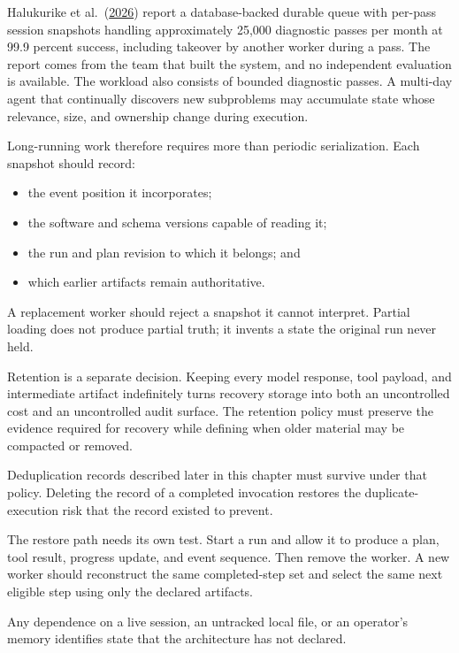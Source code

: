 Halukurike et al.~(\href{https://tech.instacart.com/blueberry-force-multiplier-for-the-on-call-engineer-98c446dfcc12}{2026}) report a database-backed durable queue with per-pass session snapshots handling approximately 25,000 diagnostic passes per month at 99.9 percent success, including takeover by another worker during a pass. The report comes from the team that built the system, and no independent evaluation is available. The workload also consists of bounded diagnostic passes. A multi-day agent that continually discovers new subproblems may accumulate state whose relevance, size, and ownership change during execution.

Long-running work therefore requires more than periodic serialization. Each snapshot should record:

\begin{itemize}
\tightlist
\item
  the event position it incorporates;
\item
  the software and schema versions capable of reading it;
\item
  the run and plan revision to which it belongs; and
\item
  which earlier artifacts remain authoritative.
\end{itemize}

A replacement worker should reject a snapshot it cannot interpret. Partial loading does not produce partial truth; it invents a state the original run never held.

Retention is a separate decision. Keeping every model response, tool payload, and intermediate artifact indefinitely turns recovery storage into both an uncontrolled cost and an uncontrolled audit surface. The retention policy must preserve the evidence required for recovery while defining when older material may be compacted or removed.

Deduplication records described later in this chapter must survive under that policy. Deleting the record of a completed invocation restores the duplicate-execution risk that the record existed to prevent.

The restore path needs its own test. Start a run and allow it to produce a plan, tool result, progress update, and event sequence. Then remove the worker. A new worker should reconstruct the same completed-step set and select the same next eligible step using only the declared artifacts.

Any dependence on a live session, an untracked local file, or an operator's memory identifies state that the architecture has not declared.

